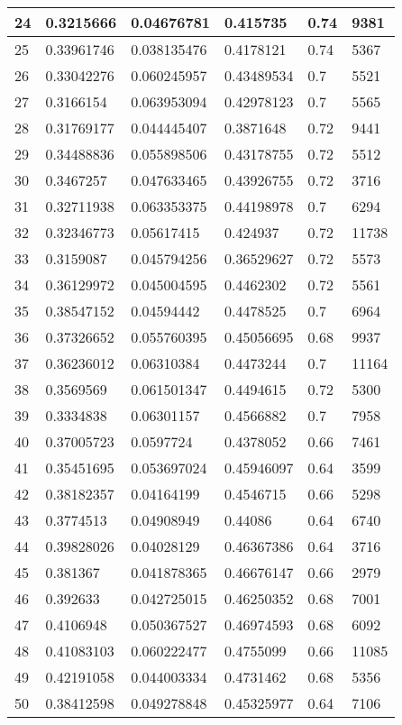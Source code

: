 \begin{longtable}{|l|l|l|l|l|l|}
24 & 0.3215666 & 0.04676781 & 0.415735 & 0.74 & 9381 \\ \hline 
25 & 0.33961746 & 0.038135476 & 0.4178121 & 0.74 & 5367 \\ \hline 
26 & 0.33042276 & 0.060245957 & 0.43489534 & 0.7 & 5521 \\ \hline 
27 & 0.3166154 & 0.063953094 & 0.42978123 & 0.7 & 5565 \\ \hline 
28 & 0.31769177 & 0.044445407 & 0.3871648 & 0.72 & 9441 \\ \hline 
29 & 0.34488836 & 0.055898506 & 0.43178755 & 0.72 & 5512 \\ \hline 
30 & 0.3467257 & 0.047633465 & 0.43926755 & 0.72 & 3716 \\ \hline 
31 & 0.32711938 & 0.063353375 & 0.44198978 & 0.7 & 6294 \\ \hline 
32 & 0.32346773 & 0.05617415 & 0.424937 & 0.72 & 11738 \\ \hline 
33 & 0.3159087 & 0.045794256 & 0.36529627 & 0.72 & 5573 \\ \hline 
34 & 0.36129972 & 0.045004595 & 0.4462302 & 0.72 & 5561 \\ \hline 
35 & 0.38547152 & 0.04594442 & 0.4478525 & 0.7 & 6964 \\ \hline 
36 & 0.37326652 & 0.055760395 & 0.45056695 & 0.68 & 9937 \\ \hline 
37 & 0.36236012 & 0.06310384 & 0.4473244 & 0.7 & 11164 \\ \hline 
38 & 0.3569569 & 0.061501347 & 0.4494615 & 0.72 & 5300 \\ \hline 
39 & 0.3334838 & 0.06301157 & 0.4566882 & 0.7 & 7958 \\ \hline 
40 & 0.37005723 & 0.0597724 & 0.4378052 & 0.66 & 7461 \\ \hline 
41 & 0.35451695 & 0.053697024 & 0.45946097 & 0.64 & 3599 \\ \hline 
42 & 0.38182357 & 0.04164199 & 0.4546715 & 0.66 & 5298 \\ \hline 
43 & 0.3774513 & 0.04908949 & 0.44086 & 0.64 & 6740 \\ \hline 
44 & 0.39828026 & 0.04028129 & 0.46367386 & 0.64 & 3716 \\ \hline 
45 & 0.381367 & 0.041878365 & 0.46676147 & 0.66 & 2979 \\ \hline 
46 & 0.392633 & 0.042725015 & 0.46250352 & 0.68 & 7001 \\ \hline 
47 & 0.4106948 & 0.050367527 & 0.46974593 & 0.68 & 6092 \\ \hline 
48 & 0.41083103 & 0.060222477 & 0.4755099 & 0.66 & 11085 \\ \hline 
49 & 0.42191058 & 0.044003334 & 0.4731462 & 0.68 & 5356 \\ \hline 
50 & 0.38412598 & 0.049278848 & 0.45325977 & 0.64 & 7106 \\ \hline 
\end{longtable}